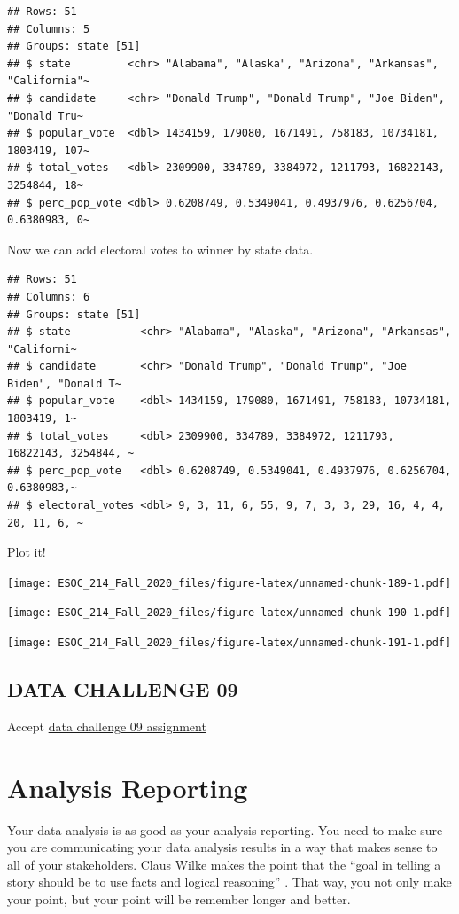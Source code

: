 \documentclass[
]{book}
\begin{document}
\begin{verbatim}
## Rows: 51
## Columns: 5
## Groups: state [51]
## $ state         <chr> "Alabama", "Alaska", "Arizona", "Arkansas", "California"~
## $ candidate     <chr> "Donald Trump", "Donald Trump", "Joe Biden", "Donald Tru~
## $ popular_vote  <dbl> 1434159, 179080, 1671491, 758183, 10734181, 1803419, 107~
## $ total_votes   <dbl> 2309900, 334789, 3384972, 1211793, 16822143, 3254844, 18~
## $ perc_pop_vote <dbl> 0.6208749, 0.5349041, 0.4937976, 0.6256704, 0.6380983, 0~
\end{verbatim}

Now we can add electoral votes to winner by state data.

\begin{verbatim}
## Rows: 51
## Columns: 6
## Groups: state [51]
## $ state           <chr> "Alabama", "Alaska", "Arizona", "Arkansas", "Californi~
## $ candidate       <chr> "Donald Trump", "Donald Trump", "Joe Biden", "Donald T~
## $ popular_vote    <dbl> 1434159, 179080, 1671491, 758183, 10734181, 1803419, 1~
## $ total_votes     <dbl> 2309900, 334789, 3384972, 1211793, 16822143, 3254844, ~
## $ perc_pop_vote   <dbl> 0.6208749, 0.5349041, 0.4937976, 0.6256704, 0.6380983,~
## $ electoral_votes <dbl> 9, 3, 11, 6, 55, 9, 7, 3, 3, 29, 16, 4, 4, 20, 11, 6, ~
\end{verbatim}

Plot it!

\texttt{[image: ESOC\_214\_Fall\_2020\_files/figure-latex/unnamed-chunk-189-1.pdf]}

\texttt{[image: ESOC\_214\_Fall\_2020\_files/figure-latex/unnamed-chunk-190-1.pdf]}

\texttt{[image: ESOC\_214\_Fall\_2020\_files/figure-latex/unnamed-chunk-191-1.pdf]}

\hypertarget{data-challenge-09}{%
\section{DATA CHALLENGE 09}\label{data-challenge-09}}

Accept \href{}{data challenge 09 assignment}

\hypertarget{analysis-reporting}{%
\chapter{Analysis Reporting}\label{analysis-reporting}}

Your data analysis is as good as your analysis reporting. You need to make sure you are communicating your data analysis results in a way that makes sense to all of your stakeholders. \href{https://clauswilke.com/dataviz/telling-a-story.html}{Claus Wilke} makes the point that the ``goal in telling a story should be to use facts and logical reasoning'' \citep{wilke2019fundamentals}. That way, you not only make your point, but your point will be remember longer and better.
\end{document}
